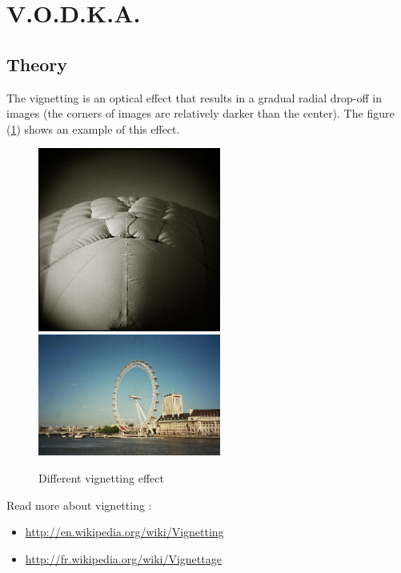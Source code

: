 
\section{V.O.D.K.A.}
\label{V.O.D.K.A.}

\subsection{Theory}

The vignetting is an optical effect that results in a gradual radial drop-off in images (the corners of images are relatively darker than the center). The figure (\ref{image_vignette}) shows an example of this effect.

\begin{figure}[htb]
\centering
\includegraphics[width=6cm]{FIGS/Arsenic/595px-Swanson_tennis_center.jpg}
\includegraphics[width=6cm]{FIGS/Arsenic/London_eye_501588_fh000038.jpg}
\caption{
Different vignetting effect
}
\label{image_vignette}
\end{figure}

Read more about vignetting :
\begin{itemize}
   \item \url{http://en.wikipedia.org/wiki/Vignetting}
   \item \url{http://fr.wikipedia.org/wiki/Vignettage}
\end{itemize}

